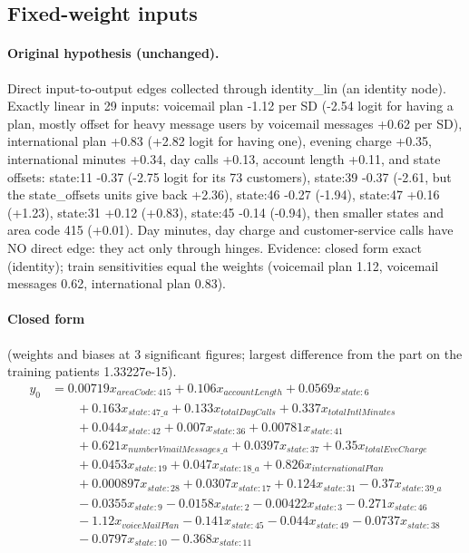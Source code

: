 \documentclass[a4paper,10pt]{article}
\newif\ifreviewmarks
\newcommand{\reviewrule}{\noindent{\color{BrickRed}\rule{\linewidth}{0.8pt}}}
\newenvironment{drafted}[1][]{%
  \ifreviewmarks\par\addvspace{\medskipamount}\reviewrule\par\nopagebreak
  \noindent{\color{BrickRed}\sffamily\footnotesize\textbf{Thesis Draft}\quad #1\hfill review}\par\nopagebreak\smallskip\fi}{%
  \ifreviewmarks\par\smallskip\noindent{\color{BrickRed}\sffamily\footnotesize end of thesis draft}\par\nopagebreak\reviewrule\par\medskip\fi}
\begin{document}
\begin{drafted}[plain-language layer: churn100-s4-c2]
\subsection{Fixed-weight inputs}\label{tech:ann79}
\paragraph{Original hypothesis (unchanged).} Direct input-to-output edges collected through identity\_\allowbreak{}lin (an identity node). Exactly linear in 29 inputs: voicemail plan -1.12 per SD (-2.54 logit for having a plan, mostly offset for heavy message users by voicemail messages +0.62 per SD), international plan +0.83 (+2.82 logit for having one), evening charge +0.35, international minutes +0.34, day calls +0.13, account length +0.11, and state offsets: state:11 -0.37 (-2.75 logit for its 73 customers), state:39 -0.37 (-2.61, but the state\_\allowbreak{}offsets units give back +2.36), state:46 -0.27 (-1.94), state:47 +0.16 (+1.23), state:31 +0.12 (+0.83), state:45 -0.14 (-0.94), then smaller states and area code 415 (+0.01). Day minutes, day charge and customer-service calls have NO direct edge: they act only through hinges. Evidence: closed form exact (identity); train sensitivities equal the weights (voicemail plan 1.12, voicemail messages 0.62, international plan 0.83).
\paragraph{Closed form} {\footnotesize(weights and biases at 3 significant figures; largest difference from the part on the training patients 1.33227e-15).}
{\small\begingroup\allowdisplaybreaks
\begin{align*}
y_{0} &= 0.00719 x_{areaCode:415} + 0.106 x_{accountLength} + 0.0569 x_{state:6} \\
&\qquad + 0.163 x_{state:47\_a} + 0.133 x_{totalDayCalls} + 0.337 x_{totalIntlMinutes} \\
&\qquad + 0.044 x_{state:42} + 0.007 x_{state:36} + 0.00781 x_{state:41} \\
&\qquad + 0.621 x_{numberVmailMessages\_a} + 0.0397 x_{state:37} + 0.35 x_{totalEveCharge} \\
&\qquad + 0.0453 x_{state:19} + 0.047 x_{state:18\_a} + 0.826 x_{internationalPlan} \\
&\qquad + 0.000897 x_{state:28} + 0.0307 x_{state:17} + 0.124 x_{state:31} - 0.37 x_{state:39\_a} \\
&\qquad - 0.0355 x_{state:9} - 0.0158 x_{state:2} - 0.00422 x_{state:3} - 0.271 x_{state:46} \\
&\qquad - 1.12 x_{voiceMailPlan} - 0.141 x_{state:45} - 0.044 x_{state:49} - 0.0737 x_{state:38} \\
&\qquad - 0.0797 x_{state:10} - 0.368 x_{state:11}
\end{align*}\endgroup}


\end{drafted}
\end{document}
